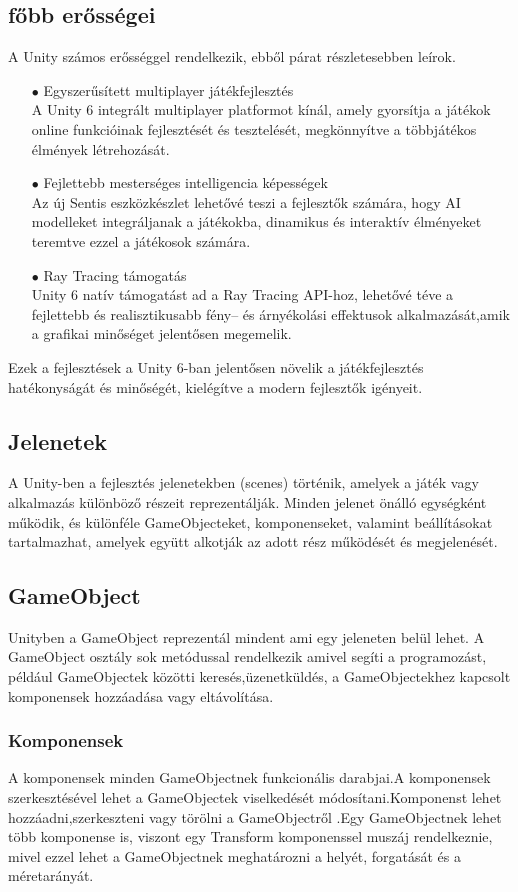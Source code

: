 \documentclass[
]{thesis-ekf}
\theoremstyle{definition}
\theoremstyle{remark}
\begin{document}
\subsection{főbb erősségei}
A Unity számos erősséggel rendelkezik, ebből párat részletesebben leírok.
\begin{itemize}
	\item[$\bullet$]Egyszerűsített multiplayer játékfejlesztés \\  A Unity 6 integrált multiplayer platformot kínál, amely gyorsítja a játékok online funkcióinak fejlesztését és tesztelését, megkönnyítve a többjátékos élmények létrehozását. 
	\item[$\bullet$]Fejlettebb mesterséges intelligencia képességek \\Az új Sentis eszközkészlet lehetővé teszi a fejlesztők számára, hogy AI modelleket integráljanak a játékokba, dinamikus és interaktív élményeket teremtve ezzel a játékosok számára. 
	\item[$\bullet$]Ray Tracing támogatás \\  Unity 6 natív támogatást ad a Ray Tracing API-hoz, lehetővé téve a fejlettebb és realisztikusabb fény-- és árnyékolási effektusok alkalmazását,amik a grafikai minőséget jelentősen megemelik.
\end{itemize}
Ezek a fejlesztések a Unity 6-ban jelentősen növelik a játékfejlesztés hatékonyságát és minőségét, kielégítve a modern fejlesztők igényeit.\cite{Unity6}


\subsection{Jelenetek}
A Unity-ben a fejlesztés jelenetekben (scenes) történik, amelyek a játék vagy alkalmazás különböző részeit reprezentálják. Minden jelenet önálló egységként működik, és különféle GameObjecteket, komponenseket, valamint beállításokat tartalmazhat, amelyek együtt alkotják az adott rész működését és megjelenését.\cite{UnityScene}
\subsection{GameObject}
Unityben a GameObject reprezentál mindent ami egy jeleneten belül lehet. A GameObject osztály sok metódussal rendelkezik amivel segíti a programozást, például GameObjectek közötti keresés,üzenetküldés, a GameObjectekhez kapcsolt komponensek hozzáadása vagy eltávolítása.\cite{UnityGameObject}

\subsubsection{Komponensek}
A komponensek minden GameObjectnek funkcionális darabjai.A komponensek szerkesztésével lehet a GameObjectek viselkedését módosítani.Komponenst lehet hozzáadni,szerkeszteni vagy törölni a GameObjectről .Egy GameObjectnek lehet több komponense is, viszont egy Transform komponenssel muszáj rendelkeznie, mivel ezzel lehet a GameObjectnek meghatározni a helyét, forgatását és a méretarányát.\cite{UnityComponents}
\end{document}
